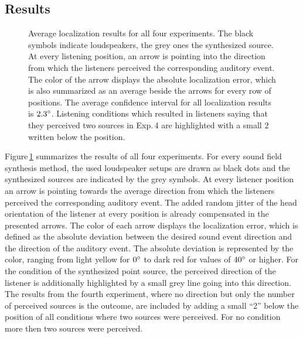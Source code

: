 \subsection{Results}
\label{sec:localization_results}
%
\begin{figure}
    \small
    \centering
    
    \caption{Average localization results for all four experiments. The black
    symbols indicate loudspeakers, the grey ones the synthesized source. At
    every listening position, an arrow is pointing into the direction from which the
    listeners perceived the corresponding auditory event. The color of the arrow
    displays the absolute localization error, which is also summarized as an
    average beside the arrows for every row of positions. The average confidence interval for
    all localization results is $2.3^\circ$. Listening conditions which
    resulted in listeners saying that they perceived two sources in Exp.\,4 are
    highlighted with a small $2$ written below the position.
    }
    \label{fig:localization_results}
\end{figure}
%
Figure\,\ref{fig:localization_results} summarizes the results of all four
experiments. For every sound field synthesis method, the used loudspeaker setups
are drawn as black dots and the synthesized sources are indicated by the grey
symbols. At every listener position an arrow is pointing towards the average direction
from which the listeners perceived the corresponding auditory event. The added random jitter
of the head orientation of the listener at every position is already compensated
in the presented arrows. The color of each arrow displays the localization
error, which is defined as the absolute deviation between the desired sound
event direction and the direction of the auditory event. The absolute deviation
is represented by the color, ranging from light yellow for $0^\circ$ to dark red
for values of $40^\circ$ or higher.
For the
condition of the synthesized point source, the perceived direction of the listener is
additionally highlighted by a small grey line going into this direction.
The results from the fourth experiment, where no direction but only the number
of perceived sources is the outcome, are included by adding a small ``2'' below the
position of all conditions where two sources were perceived. For no condition
more then two sources were perceived.

